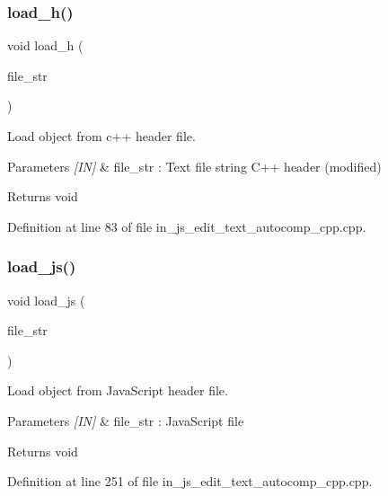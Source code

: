 \subsubsection{load\_h()}
{\footnotesize\ttfamily void load\+\_\+h (\begin{DoxyParamCaption}\item[{wx\+String}]{file\+\_\+str }\end{DoxyParamCaption})}



Load object from c++ header file. 


\begin{DoxyParams}{Parameters}
{\em \mbox{[}\+I\+N\mbox{]}} & file\+\_\+str \+: Text file string C++ header (modified) \\
\hline
\end{DoxyParams}
\begin{DoxyReturn}{Returns}
void 
\end{DoxyReturn}


Definition at line 83 of file in\+\_\+js\+\_\+edit\+\_\+text\+\_\+autocomp\+\_\+cpp.\+cpp.

\mbox{\label{group___edit__text__autocompetation_ga570d734046c87a9c8e3e0d8fe0370517}} 
\subsubsection{load\_js()}
{\footnotesize\ttfamily void load\+\_\+js (\begin{DoxyParamCaption}\item[{wx\+String}]{file\+\_\+str }\end{DoxyParamCaption})}



Load object from Java\+Script header file. 


\begin{DoxyParams}{Parameters}
{\em \mbox{[}\+I\+N\mbox{]}} & file\+\_\+str \+: Java\+Script file \\
\hline
\end{DoxyParams}
\begin{DoxyReturn}{Returns}
void 
\end{DoxyReturn}


Definition at line 251 of file in\+\_\+js\+\_\+edit\+\_\+text\+\_\+autocomp\+\_\+cpp.\+cpp.

\mbox{\label{group___edit__text__autocompetation_gae56921ac74c8785e5db4a21f34dee23e}} 
